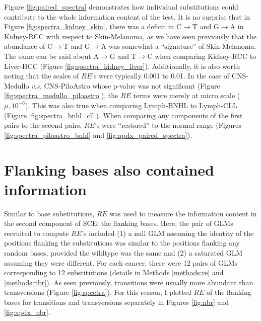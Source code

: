 Figure \ref{fig:paired_spectra} demonstrates how individual substitutions could contribute to the whole information content of the test. It is no surprise that in Figure \ref{fig:spectra_kidney_skin}, there was a deficit in C$\rightarrow$T and G$\rightarrow$A in Kidney-RCC with respect to Skin-Melanoma, as we have seen previously that the abundance of C$\rightarrow$T and G$\rightarrow$A was somewhat a ``signature'' of Skin-Melanoma. The same can be said about A$\rightarrow$G and T$\rightarrow$C when comparing Kidney-RCC to Liver-HCC (Figure \ref{fig:spectra_kidney_liver}). Additionally, it is also worth noting that the scales of $RE$'s were typically 0.001 to 0.01. In the case of CNS-Medullo \textit{v.s.} CNS-PiloAstro whose p-value was not significant (Figure \ref{fig:spectra_medullo_piloastro}), the $RE$ terms were merely at micro scale ($\mu, 10^{-6}$). This was also true when comparing Lymph-BNHL to Lymph-CLL (Figure \ref{fig:spectra_bnhl_cll}). When comparing any components of the first pairs to the second pairs, $RE$'s were ``restored'' to the normal range (Figures \ref{fig:spectra_piloastro_bnhl} and \ref{fig:apdx_paired_spectra}).



\section{Flanking bases also contained information}\label{sce:nbr}
Similar to base substitutions, $RE$ was used to measure the information content in the second component of SCE: the flanking bases. Here, the pair of GLMs recruited to compute $RE$'s included (1) a null GLM assuming the identity of the positions flanking the substitutions was similar to the positions flanking any random bases, provided the wildtype was the same and (2) a saturated GLM assuming they were different. For each cancer, there were 12 pairs of GLMs corresponding to 12 substitutions (details in Methods \ref{methods:re} and \ref{methods:nbr}). As seen previously, transitions were usually more abundant than transversions (Figure \ref{fig:spectra}). For this reason, I plotted $RE$ of the flanking bases for transitions and transversions separately in Figures \ref{fig:nbr} and \ref{fig:apdx_nbr}. 



